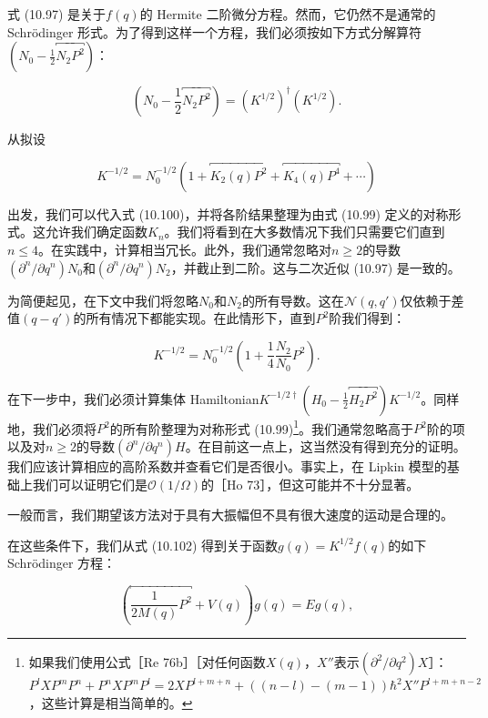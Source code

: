 式 (10.97) 是关于$f(q)$的 Hermite 二阶微分方程。然而，它仍然不是通常的 Schrödinger 形式。为了得到这样一个方程，我们必须按如下方式分解算符$(N_{0}-\frac{1}{2}\overbracket{N_{2}P^{2}})$：

\begin{equation}
\left(N_{0}-\frac{1}{2}\overbracket{N_{2}P^{2}}\right)=(K^{1/2})^{\dagger}(K^{1/2}).\label{eq:10.100}
\end{equation}

从拟设

\begin{equation}
K^{-1/2}=N^{-1/2}_{0}\left(1+\overbracket{K_{2}(q)P^{2}}+\overbracket{K_{4}(q)P^{4}}+\cdots\right)\label{eq:10.101}
\end{equation}

出发，我们可以代入式 (10.100)，并将各阶结果整理为由式 (10.99) 定义的对称形式。这允许我们确定函数$K_{n}$。我们将看到在大多数情况下我们只需要它们直到$n\le4$。在实践中，计算相当冗长。此外，我们通常忽略对$n\ge2$的导数$(\partial^{n}/\partial q^{n})N_{0}$和$(\partial^{n}/\partial q^{n})N_{2}$，并截止到二阶。这与二次近似
(10.97) 是一致的。

为简便起见，在下文中我们将忽略$N_{0}$和$N_{2}$的所有导数。这在$\mathscr{N}(q,q')$仅依赖于差值$(q-q')$的所有情况下都能实现。在此情形下，直到$P^{2}$阶我们得到：

\begin{equation}
K^{-1/2}=N^{-1/2}_{0}\left(1+\frac{1}{4}\frac{N_{2}}{N_{0}}P^{2}\right).\label{eq:10.102}
\end{equation}

在下一步中，我们必须计算集体 Hamiltonian$K^{-1/2\dagger}(H_{0}-\frac{1}{2}\overbracket{H_{2}P^{2}})K^{-1/2}$。同样地，我们必须将$P^{2}$的所有阶整理为对称形式
(10.99)\footnote{如果我们使用公式［Re 76b］［对任何函数$X(q)$，$X''$表示$(\partial^{2}/\partial q^{2})X$］：$P^{l}XP^{m}P^{n}+P^{n}XP^{m}P^{l}=2XP^{l+m+n}+((n-l)-(m-1))\hbar^{2}X''P^{l+m+n-2}$，这些计算是相当简单的。}。我们通常忽略高于$P^{2}$阶的项以及对$n\ge2$的导数$(\partial^{n}/\partial q^{n})H$。在目前这一点上，这当然没有得到充分的证明。我们应该计算相应的高阶系数并查看它们是否很小。事实上，在
Lipkin 模型的基础上我们可以证明它们是$\mathcal{O}(1/\Omega)$的［Ho 73］，但这可能并不十分显著。

一般而言，我们期望该方法对于具有大振幅但不具有很大速度的运动是合理的。

在这些条件下，我们从式 (10.102) 得到关于函数$g(q)=K^{1/2}f(q)$的如下 Schrödinger 方程：

\begin{equation}
\left(\overbracket{\frac{1}{2M(q)}P^{2}}+V(q)\right)g(q)=Eg(q),\label{eq:10.103}
\end{equation}

